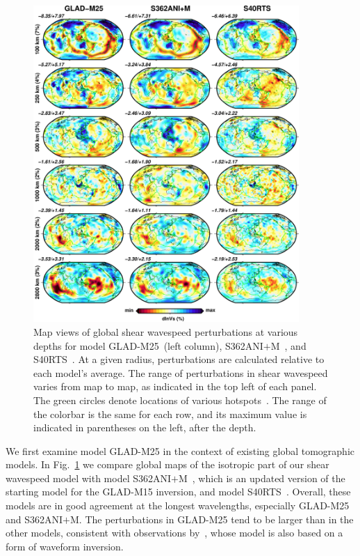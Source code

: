 \documentclass[extra,mreferee]{gji}
\begin{document}
\begin{figure}
  \centering
  \includegraphics[width=0.9\textwidth]{figures/depth_slice/globe_vs.pdf}
  \caption{\small{Map views of global shear wavespeed perturbations at various depths for  model
  GLAD-M25~(left column), S362ANI$+$M~\citep[middle column;][]{moulik2014anisotropic},
  and S40RTS~\citep[right column;][]{ritsema2011s40rts}.
  At a given radius,
  perturbations are calculated relative to each model's average.
  The range of perturbations in shear wavespeed varies from map to map, as indicated in the top left of each panel.
  The green circles denote locations of various
  hotspots~\citep{montelli2006catalogue}.
  The range of the colorbar is the same for each row,
  and its maximum value is indicated in parentheses on the left, after
  the depth.}}
  \label{fig:global-vs}
\end{figure}

We first examine model GLAD-M25 in the context of existing global tomographic models.
In Fig.~\ref{fig:global-vs} we compare global maps of the isotropic part of our
shear wavespeed model with model S362ANI$+$M~\citep{moulik2014anisotropic},
which is an updated version of the starting model for the GLAD-M15 inversion,
and model S40RTS~\citep{ritsema2011s40rts}.
Overall, these models are in good agreement
at the longest wavelengths, especially GLAD-M25 and S362ANI$+$M.
The perturbations in GLAD-M25 tend to be larger than in the other models,
consistent with observations by~\cite{french2014whole},
whose model is also based on a form of waveform inversion.
\end{document}

